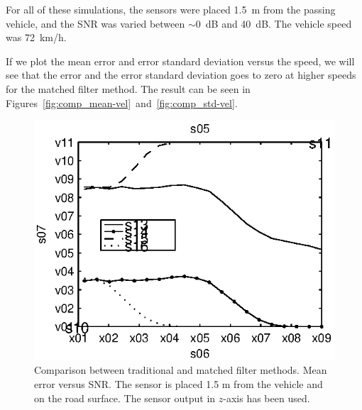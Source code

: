 For all of these simulations, the sensors were placed 1.5~m from the passing vehicle, and the SNR was varied between $\sim0{}$~dB and 40~dB. The vehicle speed was 72~km/h.

If we plot the mean error and error standard deviation versus the speed, we will see that the error and the error standard deviation goes to zero at higher speeds for the matched filter method. The result can be seen in \mbox{Figures \ref{fig:comp_mean-vel} and \ref{fig:comp_std-vel}.}

\begin{subfigures}
\begin{figure}[!tbh]
  \centering
  \begin{minipage}{0.45\linewidth}
  \centering
  
   \includegraphics[width=\linewidth]{images/mean_error_z}
  \caption[Time difference, method comparison. Mean error.  $\hat{z}$-axis.]{Comparison between traditional and matched filter methods. Mean error versus SNR. The sensor is placed 1.5 m from the vehicle and on the road surface. The sensor output in $\hat{z}$-axis has been used.}
  \label{fig:comp_mean_z}
  \end{minipage}\hfill
  \begin{minipage}{0.45\linewidth}
   \centering
   

\end{minipage}
\end{figure}
\end{subfigures}
